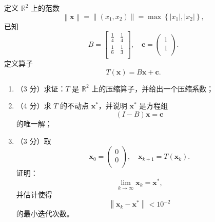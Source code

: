 \documentclass[11pt,a4paper]{exam-zh}
\newcommand{\bvec}[1]{\boldsymbol{#1}}
\newcommand{\R}{\mathbb{R}}
\begin{document}
\begin{problem}
  定义 $\R^2$ 上的范数
  $$
    \left\|\bvec{x}\right\| = \left\|\left(x_1, x_2\right)\right\| = \max \left\{ \left|x_1\right|, \left|x_2\right| \right\},
  $$
  已知
  $$
    B = \begin{bmatrix}
      \frac{1}{4} & \frac{1}{4} \\
      \frac{1}{6} & \frac{1}{3} \\
    \end{bmatrix}, \quad \bvec{c} = \begin{pmatrix}
      1 \\
      1 \\
    \end{pmatrix}.
  $$
  定义算子
  $$
    T \left(\bvec{x}\right) = B \bvec{x} + \bvec{c}.
  $$
  \begin{enumerate}
    \item （3 分）求证：$T$ 是 $\R^2$ 上的压缩算子，并给出一个压缩系数；
    \item （4 分）求 $T$ 的不动点 $\bvec{x}^*$，并说明 $\bvec{x}^*$ 是方程组 $$\left(I - B\right) \bvec{x} = \bvec{c}$$ 的唯一解；
    \item （3 分）取 $$\bvec{x}_0 = \begin{pmatrix}
      0 \\
      0 \\
    \end{pmatrix}, \quad \bvec{x}_{k + 1} = T \left(\bvec{x}_k\right).$$
    证明：$$\lim_{k \to \infty} \bvec{x}_k = \bvec{x}^*,$$
    并估计使得 $$\left\|\bvec{x}_k - \bvec{x}^*\right\| < 10^{-2}$$ 的最小迭代次数。
  \end{enumerate}
\end{problem}
\end{document}
